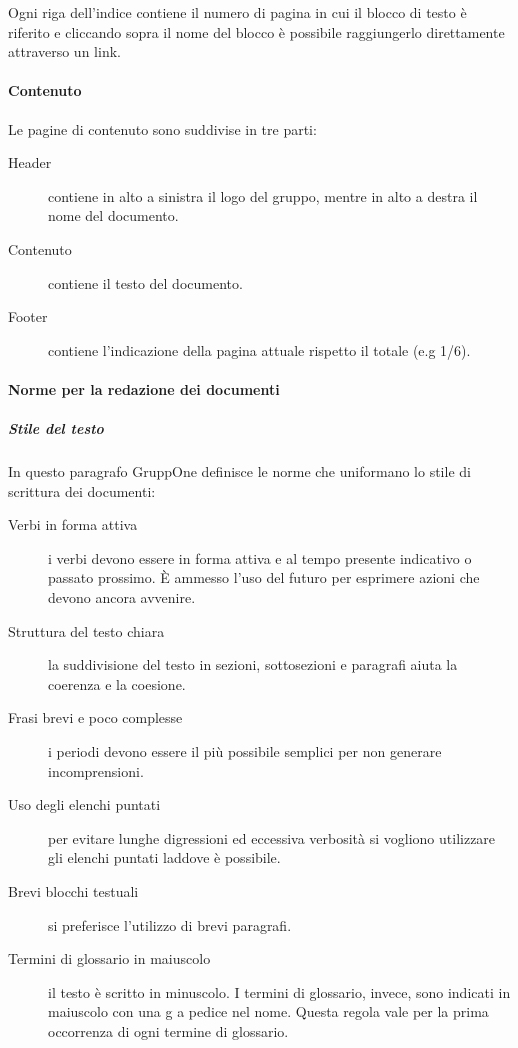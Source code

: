 \documentclass[../norme-di-progetto.tex]{subfiles}
\begin{document}
Ogni riga dell'indice contiene il numero di pagina in cui il blocco di testo è riferito e cliccando sopra il nome del blocco è possibile raggiungerlo direttamente attraverso un link.

\paragraph{Contenuto}%
\label{par:contenuto}
Le pagine di contenuto sono suddivise in tre parti:
\begin{description}
  \item [Header] contiene in alto a sinistra il logo del gruppo, mentre in alto a destra il nome del documento.
  \item [Contenuto] contiene il testo del documento.
  \item [Footer] contiene l'indicazione della pagina attuale rispetto il totale (e.g 1/6).
\end{description}

\paragraph{Norme per la redazione dei documenti}%
\label{par:norme_per_la_redazione_dei_documenti}

\subparagraph{Stile del testo}%
\label{subp:stile_del_testo}
In questo paragrafo GruppOne definisce le norme che uniformano lo stile di scrittura dei documenti:
\begin{description}
  \item [Verbi in forma attiva] i verbi devono essere in forma attiva e al tempo presente indicativo o passato prossimo. È ammesso l'uso del futuro per esprimere azioni che devono ancora avvenire.
  \item [Struttura del testo chiara] la suddivisione del testo in sezioni, sottosezioni e paragrafi aiuta la coerenza e la coesione.
  \item [Frasi brevi e poco complesse] i periodi devono essere il più possibile semplici per non generare incomprensioni.
  \item [Uso degli elenchi puntati] per evitare lunghe digressioni ed eccessiva verbosità si vogliono utilizzare gli elenchi puntati laddove è possibile.
  \item [Brevi blocchi testuali] si preferisce l'utilizzo di brevi paragrafi.
  \item [Termini di glossario in maiuscolo] il testo è scritto in minuscolo. I termini di glossario, invece, sono indicati in maiuscolo con una g a pedice nel nome. Questa regola vale per la prima occorrenza di ogni termine di glossario.
\end{description}
\end{document}
